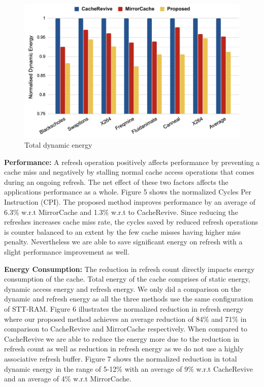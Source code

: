 \documentclass[sigconf]{acmart}
\begin{document}
\begin{figure}[t]
\includegraphics[width=\columnwidth]{res/dyn_energy.png}
\caption{Total dynamic energy}
\end{figure}





 \noindent \textbf{Performance: } A refresh operation positively affects performance by preventing a cache miss and negatively by stalling normal cache access operations that comes during an ongoing refresh. The net effect of these two factors affects the applications performance as a whole. Figure 5 shows the normalized Cycles Per Instruction (CPI). The proposed method improves performance by an average of 6.3\% w.r.t MirrorCache and 1.3\% w.r.t to CacheRevive. Since reducing the refreshes increases cache miss rate, the cycles saved by reduced refresh operations is counter balanced to an extent by the few cache misses having higher miss penalty. Nevertheless we are able to save significant energy on refresh with a slight performance improvement as well.\vspace{1em}


\noindent \textbf{Energy Consumption: }The reduction in refresh count directly impacts energy consumption of the cache. Total energy of the cache comprises of static energy, dynamic access energy and refresh energy. We only did a comparison on the dynamic and refresh energy as all the three methods use the same configuration of STT-RAM. Figure 6 illustrates the normalized reduction in refresh energy where our proposed method achieves an average reduction of 84\% and 71\% in comparison to CacheRevive and MirrorCache respectively. When compared to CacheRevive we are able to reduce the energy more due to the reduction in refresh count as well as reduction in refresh energy as we do not use a highly associative refresh buffer. Figure 7 shows the normalized reduction in total dynamic energy in the range of 5-12\% with an average of 9\% w.r.t CacheRevive and an average of 4\% w.r.t MirrorCache.
\end{document}
